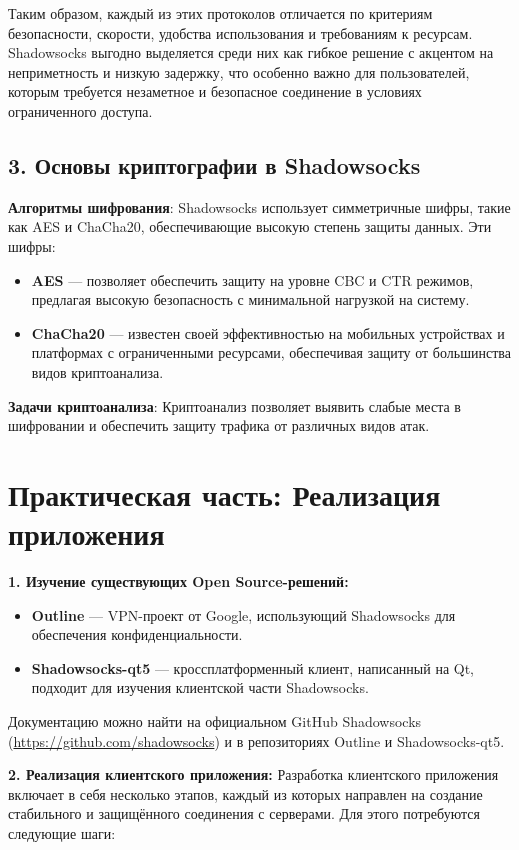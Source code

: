 \documentclass{SCWorks}
\begin{document}
Таким образом, каждый из этих протоколов отличается по критериям безопасности, скорости, удобства использования и требованиям к ресурсам. Shadowsocks выгодно выделяется среди них как гибкое решение с акцентом на неприметность и низкую задержку, что особенно важно для пользователей, которым требуется незаметное и безопасное соединение в условиях ограниченного доступа.

\subsection*{3. Основы криптографии в Shadowsocks}

\textbf{Алгоритмы шифрования}: Shadowsocks использует симметричные шифры, такие как AES и ChaCha20, обеспечивающие высокую степень защиты данных. Эти шифры:
\begin{itemize}
    \item \textbf{AES} --- позволяет обеспечить защиту на уровне CBC и CTR режимов, предлагая высокую безопасность с минимальной нагрузкой на систему.
    \item \textbf{ChaCha20} --- известен своей эффективностью на мобильных устройствах и платформах с ограниченными ресурсами, обеспечивая защиту от большинства видов криптоанализа.
\end{itemize}

\textbf{Задачи криптоанализа}: Криптоанализ позволяет выявить слабые места в шифровании и обеспечить защиту трафика от различных видов атак.

\newpage

\section*{Практическая часть: Реализация приложения}

\textbf{1. Изучение существующих Open Source-решений:}
\begin{itemize}
    \item \textbf{Outline} --- VPN-проект от Google, использующий Shadowsocks для обеспечения конфиденциальности.
    \item \textbf{Shadowsocks-qt5} --- кроссплатформенный клиент, написанный на Qt, подходит для изучения клиентской части Shadowsocks.
\end{itemize}
Документацию можно найти на официальном GitHub Shadowsocks (\url{https://github.com/shadowsocks}) и в репозиториях Outline и Shadowsocks-qt5.

\textbf{2. Реализация клиентского приложения:}  
Разработка клиентского приложения включает в себя несколько этапов, каждый из которых направлен на создание стабильного и защищённого соединения с серверами. Для этого потребуются следующие шаги:
\end{document}
